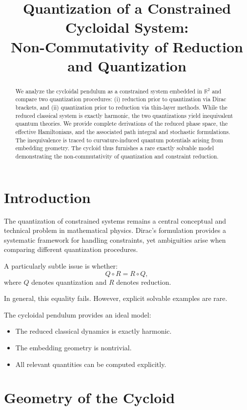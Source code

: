 \documentclass[11pt]{article}
\title{Quantization of a Constrained Cycloidal System:\\
Non-Commutativity of Reduction and Quantization}
\author{}
\date{}
\begin{document}
\maketitle

\begin{abstract}
We analyze the cycloidal pendulum as a constrained system embedded in $\mathbb{R}^2$ and compare two quantization procedures: (i) reduction prior to quantization via Dirac brackets, and (ii) quantization prior to reduction via thin-layer methods. While the reduced classical system is exactly harmonic, the two quantizations yield inequivalent quantum theories. We provide complete derivations of the reduced phase space, the effective Hamiltonians, and the associated path integral and stochastic formulations. The inequivalence is traced to curvature-induced quantum potentials arising from embedding geometry. The cycloid thus furnishes a rare exactly solvable model demonstrating the non-commutativity of quantization and constraint reduction.
\end{abstract}

\tableofcontents

\section{Introduction}

The quantization of constrained systems remains a central conceptual and technical problem in mathematical physics. Dirac's formulation provides a systematic framework for handling constraints, yet ambiguities arise when comparing different quantization procedures.

A particularly subtle issue is whether:
\[
Q \circ R = R \circ Q,
\]
where $Q$ denotes quantization and $R$ denotes reduction.

In general, this equality fails. However, explicit solvable examples are rare.

The cycloidal pendulum provides an ideal model:
\begin{itemize}
\item The reduced classical dynamics is exactly harmonic.
\item The embedding geometry is nontrivial.
\item All relevant quantities can be computed explicitly.
\end{itemize}

\section{Geometry of the Cycloid}
\end{document}
